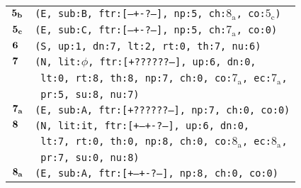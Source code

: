 \documentclass{article}
\begin{document}
\begin{minipage}{\textwidth}
{\begin{tabular}{|r|l|}
    ${\textbf{\textrm{5}}_{\textbf{\textrm{b}}}}$ & \texttt{\texttt{(E,~sub:B,~ftr:[---+-?---],~np:5,~ch:${\textrm{8}_{\textrm{a}}}$,~co:${\textrm{5}_{\textrm{c}}}$)}} \\
    ${\textbf{\textrm{5}}_{\textbf{\textrm{c}}}}$ & \texttt{\texttt{(E,~sub:C,~ftr:[---+-?---],~np:5,~ch:${\textrm{7}_{\textrm{a}}}$,~co:0)}} \\
    ${\textbf{\textrm{6}}_{\phantom{z}}}$ & \texttt{\texttt{(S,~up:1,~dn:7,~lt:2,~rt:0,~th:7,~nu:6)}} \\
    ${\textbf{\textrm{7}}_{\phantom{z}}}$ & \texttt{\texttt{(N,~lit:$\phi$,~ftr:[+??????--],~up:6,~dn:0,}} \\
    & \texttt{\texttt{~lt:0,~rt:8,~th:8,~np:7,~ch:0,~co:${\textrm{7}_{\textrm{a}}}$,~ec:${\textrm{7}_{\textrm{a}}}$,}} \\
    & \texttt{\texttt{~pr:5,~su:8,~nu:7)}} \\
    ${\textbf{\textrm{7}}_{\textbf{\textrm{a}}}}$ & \texttt{\texttt{(E,~sub:A,~ftr:[+??????--],~np:7,~ch:0,~co:0)}} \\
    ${\textbf{\textrm{8}}_{\phantom{z}}}$ & \texttt{\texttt{(N,~lit:it,~ftr:[+--+-?---],~up:6,~dn:0,}} \\
    & \texttt{\texttt{~lt:7,~rt:0,~th:0,~np:8,~ch:0,~co:${\textrm{8}_{\textrm{a}}}$,~ec:${\textrm{8}_{\textrm{a}}}$,}} \\
    & \texttt{\texttt{~pr:7,~su:0,~nu:8)}} \\
    ${\textbf{\textrm{8}}_{\textbf{\textrm{a}}}}$ & \texttt{\texttt{(E,~sub:A,~ftr:[+--+-?---],~np:8,~ch:0,~co:0)}} \\
    \hline
  \end{tabular}
  }
\end{minipage}
\bigbreak
\end{document}
